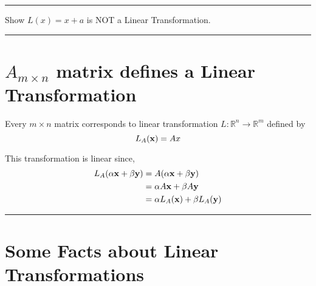 \rule[0.01in]{\textwidth}{0.0025in}





\begin{example}
Show $L(x) = x+a$ is NOT a Linear Transformation.  
\end{example}

\rule[0.01in]{\textwidth}{0.0025in}

















\section{$A_{m \times n}$ matrix defines a Linear Transformation}


\begin{theorem}
Every $m \times n$ matrix corresponds to  linear transformation $L:\mathbb{R}^n \to \mathbb{R}^m$ defined by 
\[  L_A({\bf x}) = Ax \]

This transformation is linear since, 
\begin{align*}
	L_A(\alpha {\bf x} + \beta {\bf y}) &=  A(\alpha {\bf x} + \beta {\bf y})\\
	&= \alpha A {\bf x} + \beta A {\bf y}\\
	&= \alpha L_A({\bf x}) + \beta L_A({\bf y})
\end{align*}
\end{theorem}

\rule[0.01in]{\textwidth}{0.0025in}


















\section{Some Facts about Linear Transformations}


